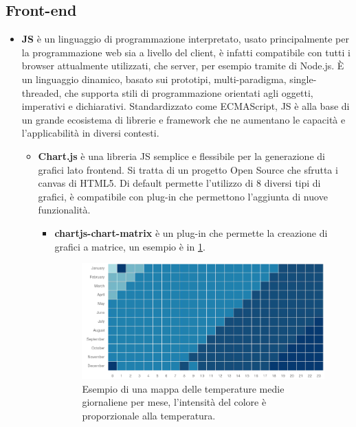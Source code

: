 \documentclass[12pt,a4paper,openright,twoside]{book}
\begin{document}
\subsection{Front-end}
\begin{itemize}[noitemsep]
    \item \textbf{\ac{JS}} è un linguaggio di programmazione interpretato, usato principalmente per la programmazione web sia a livello del client, è infatti compatibile con tutti i browser attualmente utilizzati, che server, per esempio tramite di Node.js. È un linguaggio dinamico, basato sui prototipi, multi-paradigma, single-threaded, che supporta stili di programmazione orientati agli oggetti, imperativi e dichiarativi. Standardizzato come ECMAScript, \ac{JS} è alla base di un grande ecosistema di librerie e framework che ne aumentano le capacità e l'applicabilità in diversi contesti.
    \begin{itemize}[noitemsep]
        \item \textbf{Chart.js} è una libreria \ac{JS} semplice e flessibile per la generazione di grafici lato frontend. Si tratta di un progetto Open Source che sfrutta i canvas di HTML5. Di default permette l'utilizzo di 8 diversi tipi di grafici, è compatibile con plug-in che permettono l'aggiunta di nuove funzionalità.
        \begin{itemize}[noitemsep]
            \item \textbf{chartjs-chart-matrix} è un plug-in che permette la creazione di grafici a matrice, un esempio è in \cref{fig.matrix_chart_example}.
            \begin{figure}
                \centering
                \includegraphics[width=0.9\linewidth]{./figures/matrix-chart-example.png}
                \caption{Esempio di una mappa delle temperature medie giornaliene per mese, l'intensità del colore è proporzionale alla temperatura.}
                \label{fig.matrix_chart_example}
            \end{figure}

\end{itemize}
\end{itemize}
\end{itemize}
\end{document}
